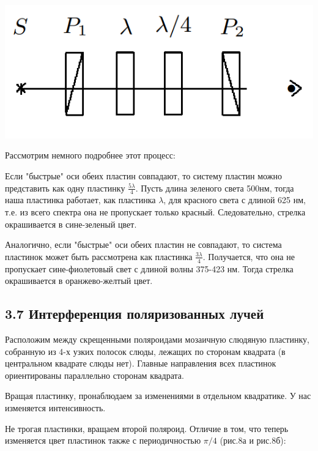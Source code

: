 \documentclass[a4paper,12pt]{report}
\begin{document}
\begin{center}
    \includegraphics[scale = 0.5]{4.png}
\end{center}

Рассмотрим немного подробнее этот процесс:

Если "быстрые" оси обеих пластин совпадают, то систему пластин можно представить как одну пластинку $\frac{5\lambda}{4}$. Пусть длина зеленого света 500нм, тогда наша пластинка работает, как пластинка $\lambda$, для красного света с длиной 625 нм, т.е. из всего спектра она не пропускает только красный. Следовательно, стрелка окрашивается в сине-зеленый цвет.

Аналогично, если "быстрые" оси обеих пластин не совпадают, то система пластинок может быть рассмотрена как пластинка $\frac{3\lambda}{4}$. Получается, что она не пропускает сине-фиолетовый свет с длиной волны 375-423 нм. Тогда стрелка окрашивается в оранжево-желтый цвет.

\subsection*{3.7 Интерференция поляризованных лучей}

Расположим между скрещенными поляроидами мозаичную слюдяную пластинку, собранную из 4-х узких полосок слюды, лежащих по сторонам квадрата (в центральном квадрате слюды нет). Главные направления всех пластинок ориентированы параллельно сторонам квадрата.

Вращая пластинку, пронаблюдаем за изменениями в отдельном квадратике. У нас изменяется интенсивность. 

Не трогая пластинки, вращаем второй поляроид. Отличие в том, что теперь изменяется цвет пластинок также с периодичностью  $\pi/4$ (рис.8а и рис.8б):
\end{document}
